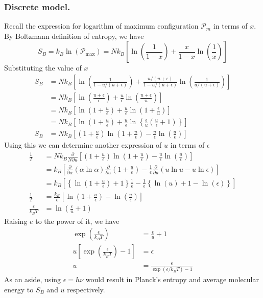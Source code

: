 \documentclass[../../../Main.tex]{subfiles}
\begin{document}
\subsubsection*{Discrete model.} Recall the expression for logarithm of maximum configuration $\mathcal{P}_m$ in terms of $x$. By Boltzmann definition of entropy, we have
\begin{equation*}
    S_B=k_B\ln(\mathcal{P}_\text{max})=Nk_B\left[\ln \left(\frac{1}{1-x}\right)+\frac{x}{1-x}\ln \left(\frac{1}{x}\right)\right]
\end{equation*} 
Substituting the value of $x$
\begin{align*}
    S_B&=Nk_B\left[\ln \left(\frac{1}{1-u/(u+\epsilon)}\right)+\frac{u/(u+\epsilon)}{1-u/(u+\epsilon)}\ln \left(\frac{1}{u/(u+\epsilon)}\right)\right]\\
    &=Nk_B\left[\ln \left(\frac{u+\epsilon}{\epsilon}\right)+\frac{u}{\epsilon}\ln \left(\frac{u+\epsilon}{u}\right)\right]\\
    &=Nk_B\left[\ln \left(1+\frac{u}{\epsilon}\right)+\frac{u}{\epsilon}\ln \left(1+\frac{\epsilon}{u}\right)\right]\\
    &=Nk_B\left[\ln \left(1+\frac{u}{\epsilon}\right)+\frac{u}{\epsilon}\ln \left\{\frac{\epsilon}{u}\left(\frac{u}{\epsilon}+1\right)\right\}\right]\\
    S_B&=Nk_B\left[\left(1+\frac{u}{\epsilon} \right) \ln \left(1+\frac{u}{\epsilon}\right)-\frac{u}{\epsilon}\ln\left(\frac{u}{\epsilon}\right)\right]
\end{align*}  
Using this we can determine another expression of $u$ in terms of $\epsilon$
\begin{align*}
    \frac{1}{T}&=Nk_B\frac{\partial}{N\partial u}\left[\left(1+\frac{u}{\epsilon} \right) \ln \left(1+\frac{u}{\epsilon}\right)-\frac{u}{\epsilon}\ln\left(\frac{u}{\epsilon}\right)\right]\\
    &=k_B\left[\frac{\partial}{\partial \alpha}\left(\alpha\ln \alpha\right)\frac{\partial}{\partial u}\left(1+\frac{u}{\epsilon}\right)-\frac{1}{\epsilon}\frac{\partial}{\partial u}\left(u\ln u-u\ln\epsilon\right)\right]\\
    &=k_B\left[\left\{\ln\left(1+\frac{u}{\epsilon} \right)+1\right\}\frac{1}{\epsilon}-\frac{1}{\epsilon}\left\{\ln (u)+1-\ln (\epsilon)\right\}\right]\\
    \frac{1}{T}&=\frac{k_B}{\epsilon}\left[\ln\left(1+\frac{u}{\epsilon}\right)-\ln\left(\frac{u}{\epsilon}\right)\right]\\
    \frac{\epsilon}{k_BT}&=\ln\left(\frac{\epsilon}{u}+1\right)
\end{align*}
Raising $e$ to the power of it, we have 
\begin{align*}
    \exp\left(\frac{\epsilon}{k_BT}\right)&=\frac{\epsilon}{u}+1\\
    u\left[\exp\left(\frac{\epsilon}{k_BT}\right)-1\right]&=\epsilon\\
    u&=\frac{\epsilon}{\exp(\epsilon/k_BT)-1}
\end{align*}
As an aside, using $\epsilon=h\nu$ would result in Planck's entropy and average molecular energy to $S_B$ and $u$ respectively.
\end{document}
